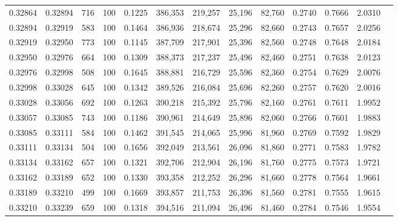 \begin{tabular}{rrrrrrrrrrrrr}
0.32864 & 0.32894 &    716 & 100 &                                     0.1225 & 386,353 & 219,257 &  25,196 &  82,760 & 0.2740 & 0.7666 & 2.0310 \\
0.32894 & 0.32919 &    583 & 100 &                                     0.1464 & 386,936 & 218,674 &  25,296 &  82,660 & 0.2743 & 0.7657 & 2.0256 \\
0.32919 & 0.32950 &    773 & 100 &                                     0.1145 & 387,709 & 217,901 &  25,396 &  82,560 & 0.2748 & 0.7648 & 2.0184 \\
0.32950 & 0.32976 &    664 & 100 &                                     0.1309 & 388,373 & 217,237 &  25,496 &  82,460 & 0.2751 & 0.7638 & 2.0123 \\
0.32976 & 0.32998 &    508 & 100 &                                     0.1645 & 388,881 & 216,729 &  25,596 &  82,360 & 0.2754 & 0.7629 & 2.0076 \\
0.32998 & 0.33028 &    645 & 100 &                                     0.1342 & 389,526 & 216,084 &  25,696 &  82,260 & 0.2757 & 0.7620 & 2.0016 \\
0.33028 & 0.33056 &    692 & 100 &                                     0.1263 & 390,218 & 215,392 &  25,796 &  82,160 & 0.2761 & 0.7611 & 1.9952 \\
0.33057 & 0.33085 &    743 & 100 &                                     0.1186 & 390,961 & 214,649 &  25,896 &  82,060 & 0.2766 & 0.7601 & 1.9883 \\
0.33085 & 0.33111 &    584 & 100 &                                     0.1462 & 391,545 & 214,065 &  25,996 &  81,960 & 0.2769 & 0.7592 & 1.9829 \\
0.33111 & 0.33134 &    504 & 100 &                                     0.1656 & 392,049 & 213,561 &  26,096 &  81,860 & 0.2771 & 0.7583 & 1.9782 \\
0.33134 & 0.33162 &    657 & 100 &                                     0.1321 & 392,706 & 212,904 &  26,196 &  81,760 & 0.2775 & 0.7573 & 1.9721 \\
0.33162 & 0.33189 &    652 & 100 &                                     0.1330 & 393,358 & 212,252 &  26,296 &  81,660 & 0.2778 & 0.7564 & 1.9661 \\
0.33189 & 0.33210 &    499 & 100 &                                     0.1669 & 393,857 & 211,753 &  26,396 &  81,560 & 0.2781 & 0.7555 & 1.9615 \\
0.33210 & 0.33239 &    659 & 100 &                                     0.1318 & 394,516 & 211,094 &  26,496 &  81,460 & 0.2784 & 0.7546 & 1.9554 \\

\end{tabular}
